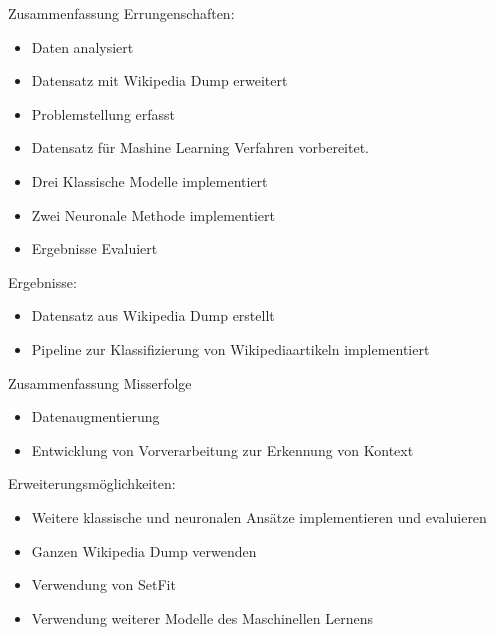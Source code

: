\documentclass[aspectratio=169]{beamer} %
\begin{document}
\begin{frame}
\begin{block}{Zusammenfassung}
Errungenschaften:
\begin{itemize}
\item Daten analysiert
\item Datensatz mit Wikipedia Dump erweitert
\item Problemstellung erfasst
\item Datensatz für Mashine Learning Verfahren vorbereitet.
\item Drei Klassische Modelle implementiert
\item Zwei Neuronale Methode implementiert
\item Ergebnisse Evaluiert
\end{itemize}
Ergebnisse:
\begin{itemize}
\item Datensatz aus Wikipedia Dump erstellt
\item Pipeline zur Klassifizierung von Wikipediaartikeln implementiert
\end{itemize}
\end{block}
\end{frame}

\begin{frame}
\begin{block}{Zusammenfassung}
Misserfolge
\begin{itemize}
\item Datenaugmentierung
\item Entwicklung von Vorverarbeitung zur Erkennung von Kontext
\end{itemize}
Erweiterungsmöglichkeiten:
\begin{itemize}
\item Weitere klassische und neuronalen Ansätze implementieren und evaluieren
\item Ganzen Wikipedia Dump verwenden
\item Verwendung von SetFit
            \item Verwendung weiterer Modelle des Maschinellen Lernens
\end{itemize}
\end{block}
\end{frame}
\end{document}
